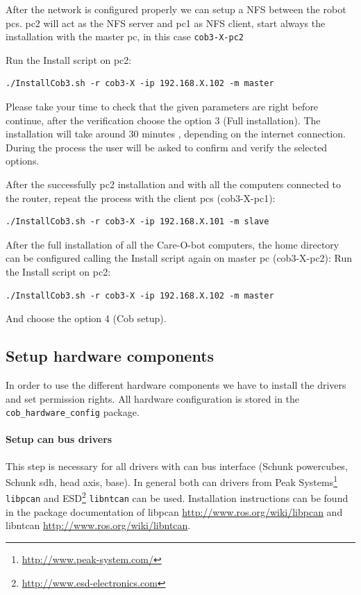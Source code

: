 After the network is configured properly we can setup a NFS between the robot pcs. pc2 will act as the NFS server and pc1 as NFS client, start always the installation with the master pc, in this case \texttt{cob3-X-pc2}

Run the Install script on pc2:
\begin{lstlisting}
./InstallCob3.sh -r cob3-X -ip 192.168.X.102 -m master
\end{lstlisting}

Please take your time to check that the given parameters are right before continue, after the verification choose the option 3 (Full installation). The installation will take around 30 minutes , depending on the internet connection. During the process the user will be asked to confirm and verify the selected options. 

After the successfully pc2 installation and with all the computers connected to the router, repeat the process with the client pcs (cob3-X-pc1):

\begin{lstlisting}
./InstallCob3.sh -r cob3-X -ip 192.168.X.101 -m slave
\end{lstlisting}

After the full installation of all the Care-O-bot computers, the home directory can be configured calling the Install script again on master pc (cob3-X-pc2):
Run the Install script on pc2:
\begin{lstlisting}
./InstallCob3.sh -r cob3-X -ip 192.168.X.102 -m master
\end{lstlisting}

And choose the option 4 (Cob setup).

\subsection{Setup hardware components}
In order to use the different hardware components we have to install the drivers and set permission rights. All hardware configuration is stored in the \texttt{cob\_hardware\_config} package.

\paragraph{Setup can bus drivers}
This step is necessary for all drivers with can bus interface (Schunk powercubes, Schunk sdh, head axis, base). In general both can drivers from Peak Systems\footnote{\url{http://www.peak-system.com/}} \texttt{libpcan} and ESD\footnote{\url{http://www.esd-electronics.com}} \texttt{libntcan} can be used. Installation instructions can be found in the package documentation of libpcan \url{http://www.ros.org/wiki/libpcan} and libntcan \url{http://www.ros.org/wiki/libntcan}.

